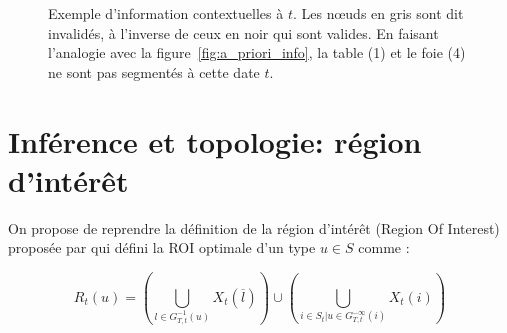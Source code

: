 \begin{figure}[!ht]
{	      }\caption{Exemple d'information contextuelles à $t$. Les n\oe{}uds en gris sont dit invalidés, à l'inverse de ceux en noir qui sont valides. En faisant l'analogie avec la figure~\ref{fig:a_priori_info}, la table (1) et le foie (4) ne sont pas segmentés à cette date $t$. }
         \label{fig:contextual_info}
	\end{figure}

\newpage
     \section{Inférence et topologie: région d'intérêt}

	On propose de reprendre la définition de la région d'intérêt (Region Of Interest) proposée par \citep[Fasquel]{Fasquel2006} qui défini la ROI optimale d'un type $u \in S$ comme :

	\begin{equation}
		R_t(u)=\left(\bigcup_{l\in G_{T,t}^{-1}(u)}X_t(\overline{l})\right) \cup \left(\bigcup_{i\in S_t| u\in G_{T,t}^{-\infty}(i)}X_t(i) \right)
		\label{eq:roi}
	\end{equation}

